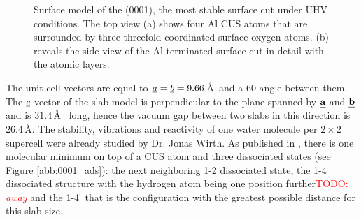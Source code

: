 \documentclass[11pt,DIV=13,BCOR=5mm,a4paper,headinclude]{scrbook}
\newcommand\todo[1]{\textcolor{red}{TODO: \textit{{#1}}}}
\def\mathbi#1{\textbf{\em #1}}
\renewcommand{\vec}[1]{\mathbi{#1}}
\begin{document}
\begin{figure}[!ht]
 \centering
{}
 \quad\quad
 \caption{Surface model of the (0001), the most stable surface cut under UHV conditions.
The top view (a) shows four Al CUS atoms that are surrounded by three threefold coordinated surface oxygen atoms.
(b) reveals the side view of the Al terminated surface cut in detail with the atomic layers.}
        \label{abb:surf_0001}
\end{figure}
The unit cell vectors are equal to $\uline{a}=\uline{b}=9.66\,$\AA  ~and a $60$\textdegree{} angle between them.
The $\uline{c}$-vector of the slab model is perpendicular to the plane spanned by $\vec{a}$ and $\vec{b}$ and is $31.4\,$\AA~ long, hence the vacuum gap between two slabs in this direction is $26.4\,$\AA.
The stability, vibrations and reactivity of one water  molecule per $2\times 2$ supercell were already studied by Dr. Jonas Wirth.
As published in \cite{WirthJPCC2012}, there is one molecular minimum on top of a CUS atom and three dissociated states (see Figure \ref{abb:0001_ads}): the next neighboring 1-2 dissociated state, the 1-4 dissociated structure with the hydrogen atom being one position further\todo{away} and the 1-4$^\prime$ that is the configuration with the greatest possible distance for this slab size.
\end{document}
